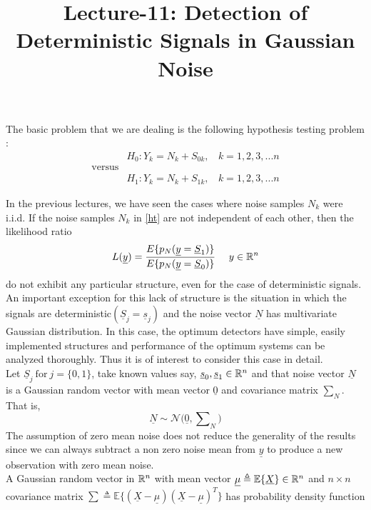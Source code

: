 \documentclass[a4paper,english,12pt]{article}
\title{Lecture-11: Detection of Deterministic Signals in Gaussian Noise}
\author{}
\begin{document}
\maketitle
\noindent The basic problem that we are dealing is the following hypothesis testing problem : 
\begin{equation}
\label{ht}
     \begin{aligned}
     & H_0 : Y_k=N_k+S_{0k} ,\ \ \ \ k=1,2,3,...n  \\
      \mbox{versus} & \\
       & H_1 : Y_k=N_k+S_{1k} ,\ \ \ \ k=1,2,3,...n
     \end{aligned}
\end{equation}


In the previous lectures, we have seen the cases where noise samples $N_k$ were i.i.d. If the noise samples $N_k$ in \eqref{ht} are not independent of each other, then the likelihood ratio 
\begin{equation}
L(\underline{y})=\frac{E \lbrace p_N(\underline{y}=\underline{S}_1)\rbrace}{E \lbrace p_N(\underline{y}=\underline{S}_0)\rbrace}  \ \ \  \ y\in \mathbb{R}^ n
\end{equation}
do not exhibit any particular structure, even for the case of deterministic signals.\\
An important exception for this lack of structure is the situation in which the signals are deterministic$(\underline{S}_j=\underline{s}_j)$ and the noise vector $\underline{N}$ has multivariate Gaussian distribution. In this case, the optimum detectors have simple, easily implemented structures and  performance of the optimum systems can be analyzed thoroughly. Thus it is of interest to consider this case in detail.\\
Let  $\underline{S}_j \ \mbox{for} \ j=\lbrace 0,1 \rbrace$, take known values say, $\underline{s}_0,\underline{s}_1 \in \mathbb{R} ^n$ and that noise vector $\underline{N}$ is a Gaussian random vector with mean vector $\underline{0}$ and covariance matrix $\sum_N$. That is,
\begin{equation}
\underline{N} \sim \mathcal{N} \Big(\underline{0}, \sum\nolimits_N \Big)
\end{equation}
The assumption of zero mean noise does not reduce the generality of the results since we can always subtract a non zero noise mean from $\underline{y}$ to produce a new observation with zero mean noise.\\
A Gaussian random vector in $\mathbb{R}^n$ with mean vector  $\underline{\mu} \triangleq \mathbb{E}\lbrace\underline{X} \rbrace \in \mathbb{R}^n$ and $n \times n $ covariance matrix $\sum \triangleq \mathbb{E} \lbrace (\underline{X}-\underline{\mu})(\underline{X}-\underline{\mu})^T \rbrace$ has probability density function 
\end{document}
